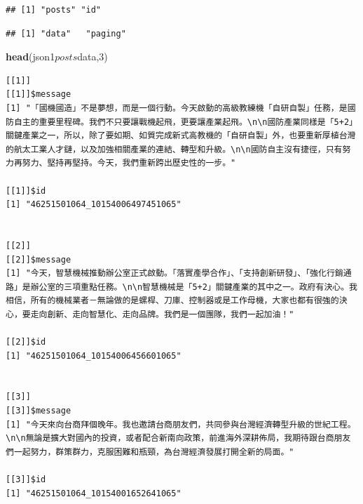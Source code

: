 \documentclass[]{book}
\newenvironment{Shaded}{\begin{snugshade}}{\end{snugshade}}
\newcommand{\KeywordTok}[1]{\textcolor[rgb]{0.13,0.29,0.53}{\textbf{{#1}}}}
\newcommand{\DecValTok}[1]{\textcolor[rgb]{0.00,0.00,0.81}{{#1}}}
\newcommand{\NormalTok}[1]{{#1}}
\theoremstyle{definition}
\theoremstyle{definition}
\theoremstyle{remark}
\begin{document}
\begin{verbatim}
## [1] "posts" "id"
\end{verbatim}

\begin{Shaded}
\end{Shaded}

\begin{verbatim}
## [1] "data"   "paging"
\end{verbatim}

\begin{Shaded}
\begin{Highlighting}[]
\KeywordTok{head}\NormalTok{(json1$posts$data,}\DecValTok{3}\NormalTok{)}
\end{Highlighting}
\end{Shaded}

\begin{verbatim}
[[1]]
[[1]]$message
[1] "「國機國造」不是夢想，而是一個行動。今天啟動的高級教練機「自研自製」任務，是國防自主的重要里程碑。我們不只要讓戰機起飛，更要讓產業起飛。\n\n國防產業同樣是「5+2」關鍵產業之一，所以，除了要如期、如質完成新式高教機的「自研自製」外，也要重新厚植台灣的航太工業人才鏈，以及加強相關產業的連結、轉型和升級。\n\n國防自主沒有捷徑，只有努力再努力、堅持再堅持。今天，我們重新跨出歷史性的一步。"

[[1]]$id
[1] "46251501064_10154006497451065"


[[2]]
[[2]]$message
[1] "今天，智慧機械推動辦公室正式啟動。「落實產學合作」、「支持創新研發」、「強化行銷通路」是辦公室的三項重點任務。\n\n智慧機械是「5+2」關鍵產業的其中之一。政府有決心。我相信，所有的機械業者－無論做的是螺桿、刀庫、控制器或是工作母機，大家也都有很強的決心，要走向創新、走向智慧化、走向品牌。我們是一個團隊，我們一起加油！"

[[2]]$id
[1] "46251501064_10154006456601065"


[[3]]
[[3]]$message
[1] "今天來向台商拜個晚年。我也邀請台商朋友們，共同參與台灣經濟轉型升級的世紀工程。\n\n無論是擴大對國內的投資，或者配合新南向政策，前進海外深耕佈局，我期待跟台商朋友們一起努力，群策群力，克服困難和瓶頸，為台灣經濟發展打開全新的局面。"

[[3]]$id
[1] "46251501064_10154001652641065"
\end{verbatim}

\begin{Shaded}
\end{Shaded}
\end{document}
